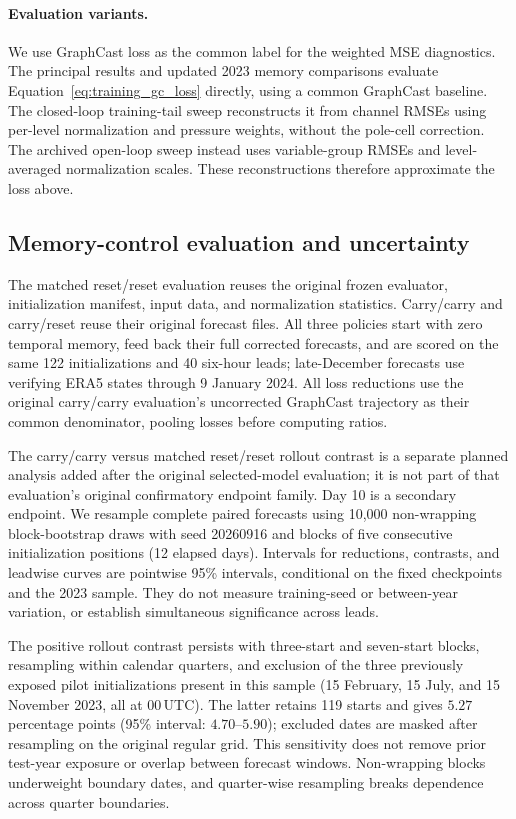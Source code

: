 \documentclass[11pt]{article}
\begin{document}
\paragraph{{Evaluation variants.}}
We use GraphCast loss as the common label for the weighted MSE diagnostics. {The principal results and updated 2023 memory comparisons evaluate Equation~\ref{eq:training_gc_loss} directly, using a common GraphCast baseline.} {The closed-loop training-tail sweep reconstructs it from channel RMSEs using per-level normalization and pressure weights, without the pole-cell correction.} The archived open-loop sweep instead uses variable-group RMSEs and level-averaged normalization scales. These reconstructions therefore approximate the loss above.

\subsection{Memory-control evaluation and uncertainty}
\label{app:memory_evaluation}

The matched reset/reset evaluation reuses the original frozen evaluator, initialization manifest, input data, and normalization statistics. Carry/carry and carry/reset reuse their original forecast files. All three policies start with zero temporal memory, feed back their full corrected forecasts, and are scored on the same 122 initializations and 40 six-hour leads; late-December forecasts use verifying ERA5 states through 9 January 2024. All loss reductions use the original carry/carry evaluation's uncorrected GraphCast trajectory as their common denominator, pooling losses before computing ratios.

The carry/carry versus matched reset/reset rollout contrast is a separate planned analysis added after the original selected-model evaluation; it is not part of that evaluation's original confirmatory endpoint family. Day 10 is a secondary endpoint. We resample complete paired forecasts using 10,000 non-wrapping block-bootstrap draws with seed 20260916 and blocks of five consecutive initialization positions (12 elapsed days). Intervals for reductions, contrasts, and leadwise curves are pointwise 95\% intervals, conditional on the fixed checkpoints and the 2023 sample. They do not measure training-seed or between-year variation, or establish simultaneous significance across leads.

The positive rollout contrast persists with three-start and seven-start blocks, resampling within calendar quarters, and exclusion of the three previously exposed pilot initializations present in this sample (15 February, 15 July, and 15 November 2023, all at 00\,UTC). The latter retains 119 starts and gives $5.27$ percentage points (95\% interval: $4.70$--$5.90$); excluded dates are masked after resampling on the original regular grid. This sensitivity does not remove prior test-year exposure or overlap between forecast windows. Non-wrapping blocks underweight boundary dates, and quarter-wise resampling breaks dependence across quarter boundaries.
\end{document}
